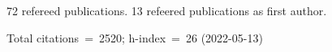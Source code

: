72 refereed publications. 13 refeered publications as first author.

Total citations~=~2520; h-index~=~26 (2022-05-13)
